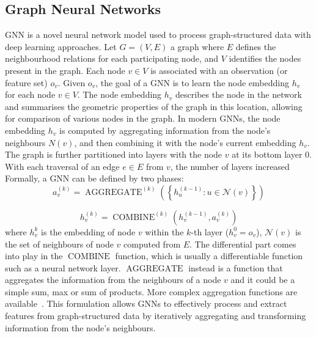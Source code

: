 \documentclass[conference]{IEEEtran}
\begin{document}
\subsection{Graph Neural Networks}
 \ac{GNN} is a novel neural network model used to process graph-structured data with deep learning approaches.
%
Let $G = (V, E)$ a graph  
where $E$ defines the neighbourhood relations for each participating node, 
and $V$ identifies the nodes present in the graph. %
% 
Each node $v \in V$ is associated with an observation (or feature set) $o_v$.
%
Given $o_v$, %
 the goal of a \ac{GNN} is to learn the node embedding $h_v$ for each node $v \in V$. The node embedding $h_v$ describes the node in the network and summarises the geometric properties of the graph in this location, allowing for comparison of various nodes in the graph.
 In modern \acp{GNN}, the node embedding $h_v$ is computed by aggregating information from the node's neighbours $N(v)$,
  and then combining it with the node's current embedding $h_v$.
 The graph is further partitioned into layers with the node $v$ at its bottom layer $0$. With each traversal of an edge $e \in E$ from $v$, the number of layers increased
Formally, a \ac{GNN} can be defined by two phases:
\begin{equation}
a_{v}^{(k)}=\operatorname{AGGREGATE}^{(k)}\left(\left\{h_{u}^{(k-1)}: u \in \mathcal{N}(v)\right\}\right)   
\end{equation}

\begin{equation}
h_{v}^{(k)}=\operatorname{COMBINE}^{(k)}\left(h_{v}^{(k-1)}, a_{v}^{(k)}\right)
\end{equation}
where $h_{v}^{k}$ is the embedding of node $v$ within the $k$-th layer ($h_v^0 = o_v$), 
 $\mathcal{N}(v)$ is the set of neighbours of node $v$ computed from $E$.
%
The differential part comes into play in the $\operatorname{COMBINE}$ function, 
 which is usually a differentiable function such as a neural network layer.
%
$\operatorname{AGGREGATE} $ instead is a function that aggregates the information from the neighbours of a node $v$
  and it could be a simple sum, max or sum of products. More complex aggregation functions are available~\cite{pellegrini2020learning}.
%
This formulation allows GNNs to effectively process and extract features from graph-structured data by iteratively aggregating and transforming information from the node's neighbours.
\end{document}
